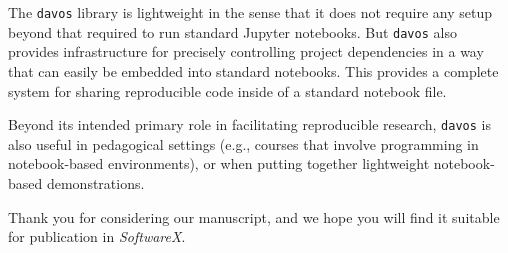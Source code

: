 \documentclass[11pt,stdletter,orderfromtodate,sigleft]{newlfm}
\begin{document}
\begin{newlfm}
 The \texttt{davos} library is lightweight in the sense that it does
 not require any setup beyond that required to run standard Jupyter
 notebooks.  But \texttt{davos} also provides infrastructure for
 precisely controlling project dependencies in a way that can easily
 be embedded into standard notebooks.  This provides a complete system
 for sharing reproducible code inside of a standard notebook file.
  
 Beyond its intended primary role in facilitating reproducible
 research, \texttt{davos} is also useful in pedagogical settings
 (e.g., courses that involve programming in notebook-based
 environments), or when putting together lightweight notebook-based
 demonstrations.

 Thank you for considering our manuscript, and we
 hope you will find it suitable for publication in \textit{SoftwareX}.


\end{newlfm}
\end{document}
